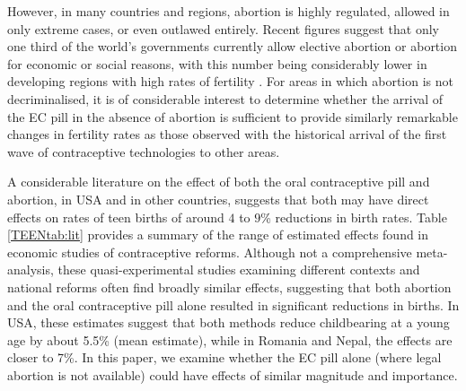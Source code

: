 However, in many countries and regions, abortion is highly regulated, allowed
in only extreme cases, or even outlawed entirely.  Recent figures suggest that 
only one third of the world's governments currently allow elective abortion or 
abortion for economic or social reasons, with this number being considerably 
lower in developing regions with high rates of fertility \citep{UN2014}.  For 
areas in which abortion is not decriminalised, it is of considerable interest 
to determine whether the arrival of the EC pill in the absence of abortion 
is sufficient to provide similarly remarkable changes in fertility rates as 
those observed with the historical arrival of the first wave of contraceptive 
technologies to other areas.


A considerable literature on the effect of both the oral contraceptive pill
and abortion, in USA and in other countries, suggests that both may have direct
effects on rates of teen births of around $4$ to $9$\% reductions in birth rates.
Table \ref{TEENtab:lit} provides a summary of the range of estimated effects
found in economic studies of contraceptive reforms.  Although not a comprehensive
meta-analysis, these quasi-experimental studies examining different contexts and
national reforms often find broadly similar effects, suggesting that both
abortion and the oral contraceptive pill alone resulted in significant 
reductions in births. In USA, these estimates suggest that both methods reduce 
childbearing at a young age by about 5.5\% (mean estimate), while in Romania 
and Nepal, the effects are closer to 7\%.  In this paper, we examine whether the 
EC pill alone (where legal abortion is not available) could have effects of
similar magnitude and importance.

